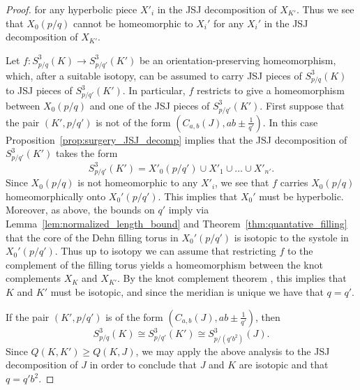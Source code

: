 \documentclass{amsart} %
\theoremstyle{thm}
\theoremstyle{definition}
\numberwithin{equation}{section}
\begin{document}
\begin{proof}
for any hyperbolic piece $X'_i$ in the JSJ decomposition of $X_{K'}$.
Thus we see that $X_0(p/q)$ cannot be homeomorphic to $X_i'$ for any $X_i'$ in the JSJ decomposition of $X_{K'}$.

Let $f\colon S_{p/q}^3(K) \rightarrow S_{p/q'}^3(K')$ be an orientation-preserving homeomorphism, which, after a suitable isotopy, can be assumed to carry JSJ pieces of $S_{p/q}^3(K)$ to JSJ pieces of $S_{p/q'}^3(K')$. In particular, $f$ restricts to give a homeomorphism between $X_0(p/q)$ and one of the JSJ pieces of $S_{p/q'}^3(K')$. First suppose that the pair $(K',p/q')$ is not of the form $(C_{a,b}(J), ab\pm \frac{1}{q'})$. In this case Proposition~\ref{prop:surgery_JSJ_decomp} implies that the JSJ decomposition of $S_{p/q'}^3(K')$ takes the form
\[S_{p/q'}^3(K')=X'_0(p/q') \cup X'_1 \cup \dots \cup X'_{n'}.\]
Since $X_0(p/q)$ is not homeomorphic to any $X'_i$, we see that $f$ carries $X_0(p/q)$ homeomorphically onto $X_0'(p/q')$. This implies that $X_0'$ must be hyperbolic. Moreover, as above, the bounds on $q'$ imply via Lemma~\ref{lem:normalized_length_bound} and Theorem~\ref{thm:quantative_filling} that the core of the Dehn filling torus in $X_0'(p/q')$ is isotopic to the systole in $X_0'(p/q')$. Thus up to isotopy we can assume that restricting $f$ to the complement of the filling torus yields a homeomorphism between the knot complements $X_K$ and $X_{K'}$. By the knot complement theorem \cite{GL89}, this implies that $K$ and $K'$ must be isotopic, and since the meridian is unique we have that $q=q'$.

If the pair $(K',p/q')$ is of the form $(C_{a,b}(J), ab\pm \frac{1}{q'})$, then
\[
S_{p/q}^3(K)\cong S_{p/q'}^3(K')\cong S_{p/(q'b^2)}^3(J).
\]
Since $Q(K, K')\geq Q(K,J)$, we may apply the above analysis to the JSJ decomposition of $J$ in order to conclude that $J$ and $K$ are isotopic and that $q=q'b^2$.
\end{proof}
\end{document}
